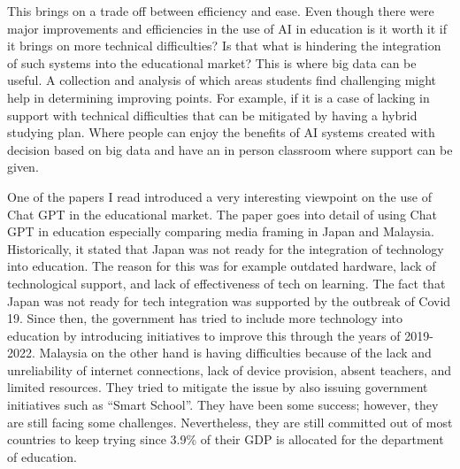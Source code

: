 \documentclass{imc-inf}
\begin{document}
This brings on a trade off between efficiency and ease. Even though there were major improvements and efficiencies in the use of AI in education is it worth it if it brings on more technical difficulties? Is that what is hindering the integration of such systems into the educational market? 
This is where big data can be useful. A collection and analysis of which areas students find challenging might help in determining improving points. For example, if it is a case of lacking in support with technical difficulties that can be mitigated by having a hybrid studying plan. Where people can enjoy the benefits of AI systems created with decision based on big data and have an in person classroom where support can be given. 

One of the papers I read introduced a very interesting viewpoint on the use of Chat GPT in the educational market. The paper \cite{3} goes into detail of using Chat GPT in education especially comparing media framing in Japan and Malaysia. Historically, it stated that Japan was not ready for the integration of technology  into education. The reason for this was for example outdated hardware, lack of technological support, and lack of effectiveness of tech on learning. The fact that Japan was not ready for tech integration was supported by the outbreak of Covid 19. Since then, the government has tried to include more technology into education by introducing initiatives to improve this through the years of 2019-2022. Malaysia on the other hand is having difficulties because of the lack and unreliability of internet connections, lack of device provision, absent teachers, and limited resources. They tried to mitigate the issue by also issuing government initiatives such as “Smart School”. They have been some success; however, they are still facing some challenges. Nevertheless, they are still committed out of most countries to keep trying since 3.9\% of their GDP is allocated for the department of education. 
\end{document}
